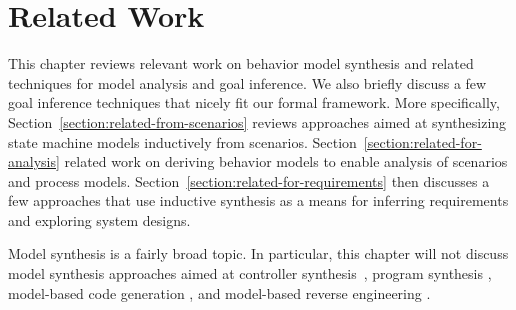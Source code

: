 \chapter{Related Work\label{chapter:related-work}}

This chapter reviews relevant work on behavior model synthesis and related techniques for model analysis and goal inference. We also briefly discuss a few goal inference techniques that nicely fit our formal framework. More specifically, Section~\ref{section:related-from-scenarios} reviews approaches aimed at synthesizing state machine models inductively from scenarios. Section~\ref{section:related-for-analysis} related work on deriving behavior models to enable analysis of scenarios and process models. Section~\ref{section:related-for-requirements} then discusses a few approaches that use inductive synthesis as a means for inferring requirements and exploring system designs.

Model synthesis is a fairly broad topic. In particular, this chapter will not discuss model synthesis approaches aimed at controller synthesis~\cite{Clarke:1981, Pnueli:1989, Asarin:1995}, program synthesis \cite{Manna:1971, Balzer:1985, Wasowski:2003}, model-based code generation \cite{Kohler:2000, Wasowski:2003}, and model-based reverse engineering \cite{Briand:2003, Yu:2005}.





